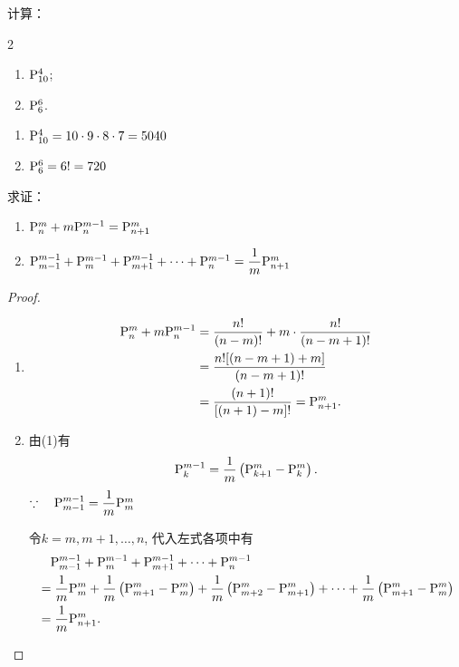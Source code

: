 \begin{example}
计算：
\begin{multicols}{2}
    \begin{enumerate}[(1)]
    \item $\perm{10}{4}$; 
    \item $\perm{6}{6}$.
\end{enumerate}
\end{multicols}
\end{example}

\begin{solution}
\begin{enumerate}[(1)]
    \item $\perm{10}{4}=10\cdot 9\cdot 8\cdot 7=5040$
    \item $\perm{6}{6}=6!=720$
\end{enumerate}
\end{solution}

\begin{example}
求证：
\begin{enumerate}[(1)]
    \item $\perm{n}{m}+m\perm{n}{m-1}=\perm{n+1}{m}$
    \item $\perm{m-1}{m-1}+\perm{m}{m-1}+\perm{m+1}{m-1}+\cdots+\perm{n}{m-1}=\frac{1}{m}\perm{n+1}{m}$
\end{enumerate}
\end{example}

\begin{proof}
\begin{enumerate}[(1)]
    \item \[\begin{split}
        \perm{n}{m}+m\perm{n}{m-1}&=\frac{n!}{(n-m)!}+m\cdot \frac{n!}{(n-m+1)!}\\
&=\frac{n![(n-m+1)+m]}{(n-m+1)!}\\
&=\frac{(n+1)!}{[(n+1)-m]!}=\perm{n+1}{m}.
    \end{split}\]
    \item 由(1)有
\[\perm{k}{m-1}=\frac{1}{m}\left(\perm{k+1}{m}-\perm{k}{m}\right).\] 
$\because\quad \perm{m-1}{m-1}=\frac{1}{m}\perm{m}{m}$

令$k=m,m+1,\ldots,n$, 代入左式各项中有
\[\begin{split}
    &\quad \perm{m-1}{m-1}+\perm{m}{m-1}+\perm{m+1}{m-1}+\cdots+\perm{n}{m-1}\\
    &=\frac{1}{m}\perm{m}{m}+\frac{1}{m}\left(\perm{m+1}{m}-\perm{m}{m}\right)+\frac{1}{m}\left(\perm{m+2}{m}-\perm{m+1}{m}\right)+\cdots+\frac{1}{m}\left(\perm{m+1}{m}-\perm{m}{m}\right)\\
    & =\frac{1}{m}\perm{n+1}{m}.
\end{split}\]
\end{enumerate}
\end{proof}


